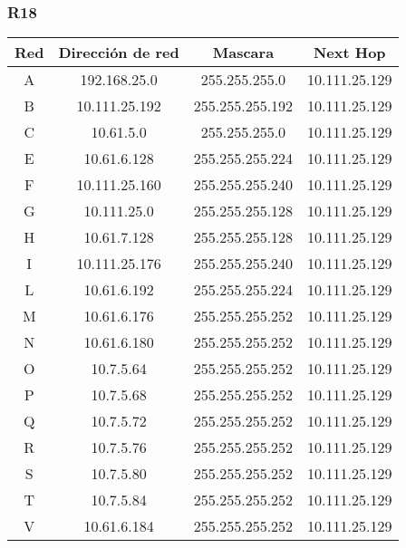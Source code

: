 \subsubsection{R18}
\begin{table}[!htbp]
\centering
  \begin{tabular}{|c|c|c|c|}
    \hline
	Red & Dirección de red & Mascara & Next Hop\\ \hline
	A & 192.168.25.0 & 255.255.255.0 & 10.111.25.129 \\ \hline
	B & 10.111.25.192 & 255.255.255.192 & 10.111.25.129 \\ \hline
	C & 10.61.5.0 & 255.255.255.0 & 10.111.25.129 \\ \hline
	E & 10.61.6.128 & 255.255.255.224 & 10.111.25.129 \\ \hline
	F & 10.111.25.160 & 255.255.255.240 & 10.111.25.129 \\ \hline
	G & 10.111.25.0 & 255.255.255.128 & 10.111.25.129 \\ \hline
	H & 10.61.7.128 & 255.255.255.128 & 10.111.25.129 \\ \hline
	I & 10.111.25.176 & 255.255.255.240 & 10.111.25.129 \\ \hline
	L & 10.61.6.192 & 255.255.255.224 & 10.111.25.129 \\ \hline
	M & 10.61.6.176 & 255.255.255.252 & 10.111.25.129 \\ \hline
	N & 10.61.6.180 & 255.255.255.252 & 10.111.25.129 \\ \hline
	O & 10.7.5.64 & 255.255.255.252 & 10.111.25.129 \\ \hline
	P & 10.7.5.68 & 255.255.255.252 & 10.111.25.129 \\ \hline
	Q & 10.7.5.72 & 255.255.255.252 & 10.111.25.129 \\ \hline
	R & 10.7.5.76 & 255.255.255.252 & 10.111.25.129 \\ \hline
	S & 10.7.5.80 & 255.255.255.252 & 10.111.25.129 \\ \hline
	T & 10.7.5.84 & 255.255.255.252 & 10.111.25.129 \\ \hline
	V & 10.61.6.184 & 255.255.255.252 & 10.111.25.129 \\
    \hline
  \end{tabular}
\end{table}

\newpage

